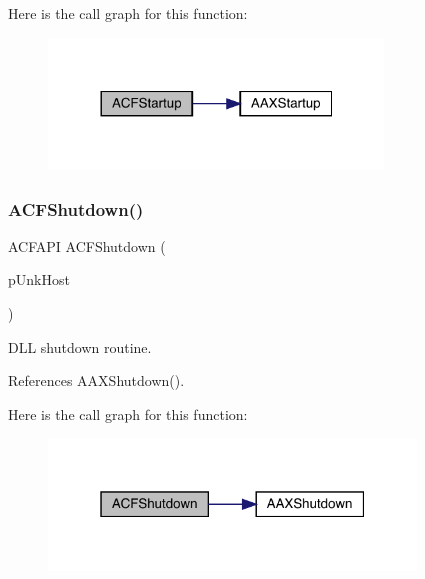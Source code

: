 Here is the call graph for this function\+:
\nopagebreak
\begin{figure}[H]
\begin{center}
\leavevmode
\includegraphics[width=252pt]{a00500_ada314f5040499160998c3c444fbe4dfd_cgraph}
\end{center}
\end{figure}
\mbox{\label{a00500_aba48dc247519ce7ecd2c064e928d9f18}} 
\subsubsection{\texorpdfstring{ACFShutdown()}{ACFShutdown()}}
{\footnotesize\ttfamily A\+C\+F\+A\+PI A\+C\+F\+Shutdown (\begin{DoxyParamCaption}\item[{\mbox{\hyperlink{a01409}{I\+A\+C\+F\+Unknown}} $\ast$}]{p\+Unk\+Host }\end{DoxyParamCaption})}



D\+LL shutdown routine. 



References A\+A\+X\+Shutdown().

Here is the call graph for this function\+:
\nopagebreak
\begin{figure}[H]
\begin{center}
\leavevmode
\includegraphics[width=277pt]{a00500_aba48dc247519ce7ecd2c064e928d9f18_cgraph}
\end{center}
\end{figure}
\mbox{\label{a00500_a2a47c5f7e29baf716a4c4956389e83c9}} 
